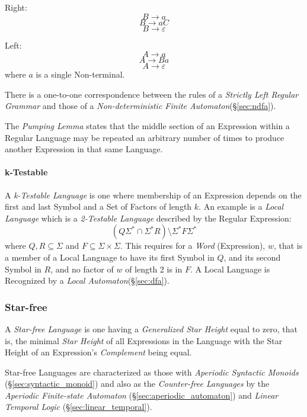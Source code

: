 Right:
\[
    B \rightarrow a
\]\[
    B \rightarrow aC
\]\[
    B \rightarrow \varepsilon
\]

Left:
\[
    A \rightarrow a
\]\[
    A \rightarrow Ba
\]\[
    A \rightarrow \varepsilon
\]
where $a$ is a single Non-terminal.

There is a one-to-one correspondence between the rules of a
\emph{Strictly Left Regular Grammar} and those of a
\emph{Non-deterministic Finite Automaton}(\S\ref{sec:ndfa}).

The \emph{Pumping Lemma} states that the middle section of an
Expression within a Regular Language may be repeated an arbitrary
number of times to produce another Expression in that same Language.

\paragraph{k-Testable}\label{sec:k_testable}
A \emph{k-Testable Language} is one where membership of an Expression
depends on the first and last Symbol and a Set of Factors of length
$k$. An example is a \emph{Local Language} which is a \emph{2-Testable
  Language} described by the Regular Expression:
\[
    (Q\Sigma^* \cap \Sigma^*R)\setminus\Sigma^*F\Sigma^*
\]
where $Q,R \subseteq \Sigma$ and $F \subseteq \Sigma \times
\Sigma$. This requires for a \emph{Word} (Expression), $w$, that is a
member of a Local Language to have its first Symbol in $Q$, and its
second Symbol in $R$, and no factor of $w$ of length 2 is in $F$. A
Local Language is Recognized by a \emph{Local
  Automaton}(\S\ref{sec:dfa}).



\subsubsection{Star-free}\label{sec:starfree_grammar}

A \emph{Star-free Language} is one having a \emph{Generalized Star
  Height} equal to zero, that is, the minimal \emph{Star Height} of
all Expressions in the Language with the Star Height of an
Expression's \emph{Complement} being equal.

Star-free Languages are characterized as those with \emph{Aperiodic
  Syntactic Monoids}\cite{schutzenberger65}
(\S\ref{sec:syntactic_monoid}) and also as the \emph{Counter-free
  Languages}\cite{mcnaughton-papert71} by the \emph{Aperiodic
  Finite-state Automaton} (\S\ref{sec:aperiodic_automaton}) and
\emph{Linear Temporal Logic} (\S\ref{sec:linear_temporal}).



